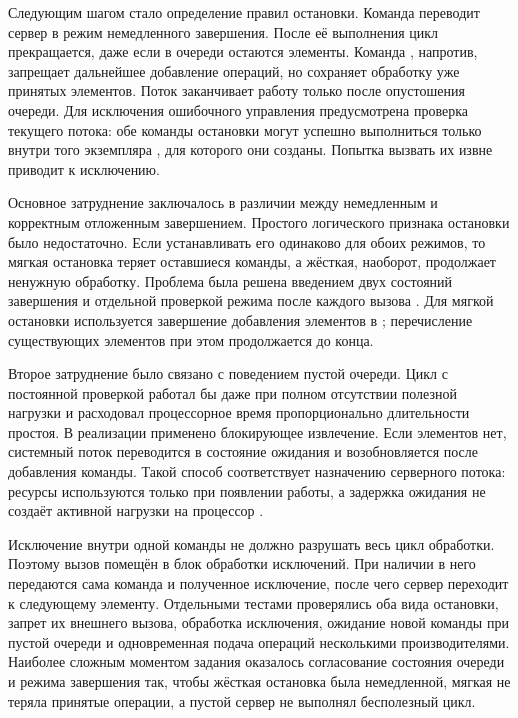 Следующим шагом стало определение правил остановки. Команда  переводит сервер в режим немедленного завершения. После её выполнения цикл прекращается, даже если в очереди остаются элементы. Команда , напротив, запрещает дальнейшее добавление операций, но сохраняет обработку уже принятых элементов. Поток заканчивает работу только после опустошения очереди. Для исключения ошибочного управления предусмотрена проверка текущего потока: обе команды остановки могут успешно выполниться только внутри того экземпляра , для которого они созданы. Попытка вызвать их извне приводит к исключению.

Основное затруднение заключалось в различии между немедленным и корректным отложенным завершением. Простого логического признака остановки было недостаточно. Если устанавливать его одинаково для обоих режимов, то мягкая остановка теряет оставшиеся команды, а жёсткая, наоборот, продолжает ненужную обработку. Проблема была решена введением двух состояний завершения и отдельной проверкой режима после каждого вызова . Для мягкой остановки используется завершение добавления элементов в ; перечисление существующих элементов при этом продолжается до конца.

Второе затруднение было связано с поведением пустой очереди. Цикл с постоянной проверкой  работал бы даже при полном отсутствии полезной нагрузки и расходовал процессорное время пропорционально длительности простоя. В реализации применено блокирующее извлечение. Если элементов нет, системный поток переводится в состояние ожидания и возобновляется после добавления команды. Такой способ соответствует назначению серверного потока: ресурсы используются только при появлении работы, а задержка ожидания не создаёт активной нагрузки на процессор \cite{threads}.

Исключение внутри одной команды не должно разрушать весь цикл обработки. Поэтому вызов  помещён в блок обработки исключений. При наличии  в него передаются сама команда и полученное исключение, после чего сервер переходит к следующему элементу. Отдельными тестами проверялись оба вида остановки, запрет их внешнего вызова, обработка исключения, ожидание новой команды при пустой очереди и одновременная подача операций несколькими производителями. Наиболее сложным моментом задания оказалось согласование состояния очереди и режима завершения так, чтобы жёсткая остановка была немедленной, мягкая не теряла принятые операции, а пустой сервер не выполнял бесполезный цикл.

